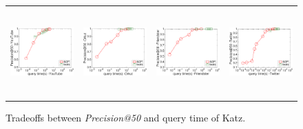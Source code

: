 \begin{figure}[t]
	\begin{small}
		\centering
		\vspace{-2mm}
		\begin{tabular}{cccc}
			\hspace{-4mm} \includegraphics[height=33.8mm]{./Figs/Katz-precision-query-YT.eps} &
			\hspace{-4mm} \includegraphics[height=33.8mm]{./Figs/Katz-precision-query-OL.eps} &
			\hspace{-4mm} \includegraphics[height=33.8mm]{./Figs/Katz-precision-query-FR.eps} &
			\hspace{-4mm} \includegraphics[height=33.8mm]{./Figs/Katz-precision-query-TW.eps} 
		\end{tabular}
		\vspace{-5mm}
		\caption{Tradeoffs between {\em Precision@50} and query time of Katz.}
		\label{fig:Katz-precision-query}
	    \vspace{-2mm}
	\end{small}
\end{figure}

